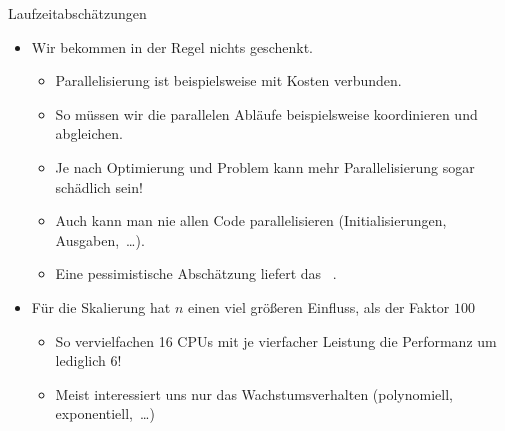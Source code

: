{\iffull
{\AddonFrame
\begin{frame}{Laufzeitabschätzungen}
    \begin{itemize}[<+(1)->]
        \itemsep16pt
        \item Wir bekommen in der Regel  nichts geschenkt.
        \begin{itemize}
            \itemsep3.5pt
            \item Parallelisierung ist beispielsweise mit Kosten verbunden.
            \item So müssen wir die parallelen Abläufe beispielsweise koordinieren und abgleichen.
            \item Je nach Optimierung und Problem kann mehr Parallelisierung sogar schädlich sein!
            \item Auch kann man nie allen Code parallelisieren (Initialisierungen, Ausgaben,~\ldots).
            \item Eine pessimistische Abschätzung liefert das ~.
        \end{itemize}
        \item Für die Skalierung hat \(n\)\raisebox{3pt}{\scriptsize2} einen viel größeren Einfluss, als der Faktor \(100\) \begin{itemize}
            \itemsep3.5pt
            \item So vervielfachen 16 CPUs mit je vierfacher Leistung die Performanz um lediglich \(6\)!
            \item Meist interessiert uns nur das Wachstumsverhalten (polynomiell, exponentiell,~\ldots)
        \end{itemize}
    \end{itemize}
\end{frame}}
\fi
}

